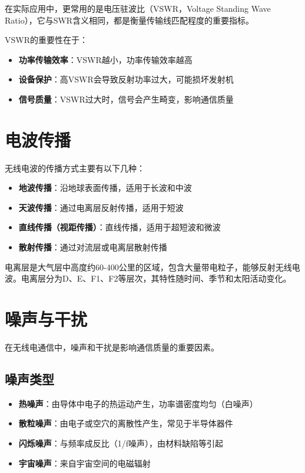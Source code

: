 在实际应用中，更常用的是电压驻波比（VSWR，Voltage Standing Wave Ratio），它与SWR含义相同，都是衡量传输线匹配程度的重要指标。

VSWR的重要性在于：

\begin{itemize}
    \item \textbf{功率传输效率}：VSWR越小，功率传输效率越高
    \item \textbf{设备保护}：高VSWR会导致反射功率过大，可能损坏发射机
    \item \textbf{信号质量}：VSWR过大时，信号会产生畸变，影响通信质量
\end{itemize}

\section{电波传播}
\label{sec:wave_propagation}

无线电波的传播方式主要有以下几种：

\begin{itemize}
    \item \textbf{地波传播}：沿地球表面传播，适用于长波和中波
    \item \textbf{天波传播}：通过电离层反射传播，适用于短波
    \item \textbf{直线传播（视距传播）}：直线传播，适用于超短波和微波
    \item \textbf{散射传播}：通过对流层或电离层散射传播
\end{itemize}

电离层是大气层中高度约60-400公里的区域，包含大量带电粒子，能够反射无线电波。电离层分为D、E、F1、F2等层次，其特性随时间、季节和太阳活动变化。

\section{噪声与干扰}
\label{sec:noise_interference}

在无线电通信中，噪声和干扰是影响通信质量的重要因素。

\subsection{噪声类型}

\begin{itemize}
    \item \textbf{热噪声}：由导体中电子的热运动产生，功率谱密度均匀（白噪声）
    \item \textbf{散粒噪声}：由电子或空穴的离散性产生，常见于半导体器件
    \item \textbf{闪烁噪声}：与频率成反比（1/f噪声），由材料缺陷等引起
    \item \textbf{宇宙噪声}：来自宇宙空间的电磁辐射
\end{itemize}

